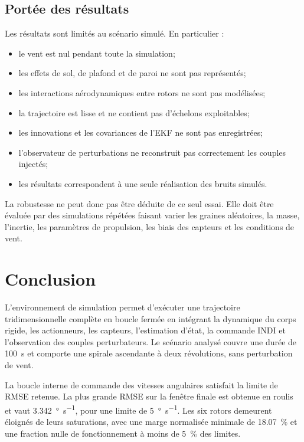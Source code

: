 \documentclass[11pt,a4paper,oneside]{report}
\begin{document}
\section{Portée des résultats}

Les résultats sont limités au scénario simulé. En particulier :
\begin{itemize}
	\item le vent est nul pendant toute la simulation;
	\item les effets de sol, de plafond et de paroi ne sont pas représentés;
	\item les interactions aérodynamiques entre rotors ne sont pas modélisées;
	\item la trajectoire est lisse et ne contient pas d'échelons exploitables;
	\item les innovations et les covariances de l'EKF ne sont pas enregistrées;
	\item l'observateur de perturbations ne reconstruit pas correctement les couples injectés;
	\item les résultats correspondent à une seule réalisation des bruits simulés.
\end{itemize}

La robustesse ne peut donc pas être déduite de ce seul essai. Elle doit être évaluée par des simulations répétées faisant varier les graines aléatoires, la masse, l'inertie, les paramètres de propulsion, les biais des capteurs et les conditions de vent.

\chapter{Conclusion}
\label{chap_conclusion}

L'environnement de simulation permet d'exécuter une trajectoire tridimensionnelle complète en boucle fermée en intégrant la dynamique du corps rigide, les actionneurs, les capteurs, l'estimation d'état, la commande INDI et l'observation des couples perturbateurs. Le scénario analysé couvre une durée de \SI{100}{s} et comporte une spirale ascendante à deux révolutions, sans perturbation de vent.

La boucle interne de commande des vitesses angulaires satisfait la limite de RMSE retenue. La plus grande RMSE sur la fenêtre finale est obtenue en roulis et vaut \SI{3.342}{\degree.s^{-1}}, pour une limite de \SI{5}{\degree.s^{-1}}. Les six rotors demeurent éloignés de leurs saturations, avec une marge normalisée minimale de \SI{18.07}{\percent} et une fraction nulle de fonctionnement à moins de \SI{5}{\percent} des limites.
\end{document}
